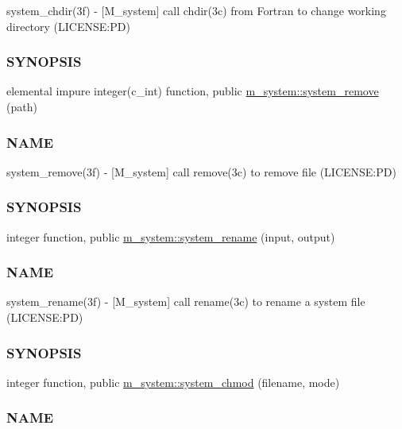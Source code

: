 \begin{DoxyCompactItemize}
\begin{DoxyCompactList}
system\+\_\+chdir(3f) -\/ \mbox{[}M\+\_\+system\mbox{]} call chdir(3c) from Fortran to change working directory (L\+I\+C\+E\+N\+SE\+:PD) \subsubsection*{S\+Y\+N\+O\+P\+S\+IS}\end{DoxyCompactList}\item 
elemental impure integer(c\+\_\+int) function, public \mbox{\hyperlink{namespacem__system_a7fa10b991ae066609b687423918cff52}{m\+\_\+system\+::system\+\_\+remove}} (path)
\begin{DoxyCompactList}\small\item\em \subsubsection*{N\+A\+ME}

system\+\_\+remove(3f) -\/ \mbox{[}M\+\_\+system\mbox{]} call remove(3c) to remove file (L\+I\+C\+E\+N\+SE\+:PD) \subsubsection*{S\+Y\+N\+O\+P\+S\+IS}\end{DoxyCompactList}\item 
integer function, public \mbox{\hyperlink{namespacem__system_adfbaf3d17790da9ba0c520683d5b8003}{m\+\_\+system\+::system\+\_\+rename}} (input, output)
\begin{DoxyCompactList}\small\item\em \subsubsection*{N\+A\+ME}

system\+\_\+rename(3f) -\/ \mbox{[}M\+\_\+system\mbox{]} call rename(3c) to rename a system file (L\+I\+C\+E\+N\+SE\+:PD) \subsubsection*{S\+Y\+N\+O\+P\+S\+IS}\end{DoxyCompactList}\item 
integer function, public \mbox{\hyperlink{namespacem__system_ace9ce0c8a9c8341a76b8903cd2390ce3}{m\+\_\+system\+::system\+\_\+chmod}} (filename, mode)
\begin{DoxyCompactList}\small\item\em \subsubsection*{N\+A\+ME}


\end{DoxyCompactList}
\end{DoxyCompactItemize}
